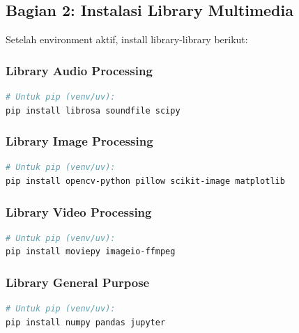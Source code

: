 \documentclass[11pt,a4paper]{article}
\begin{document}
\subsection{Bagian 2: Instalasi Library Multimedia}
Setelah environment aktif, install library-library berikut:

\subsubsection{Library Audio Processing}
\begin{lstlisting}[language=bash, caption=Instalasi library audio]
# Untuk pip (venv/uv):
pip install librosa soundfile scipy
\end{lstlisting}

\subsubsection{Library Image Processing}
\begin{lstlisting}[language=bash, caption=Instalasi library image]
# Untuk pip (venv/uv):
pip install opencv-python pillow scikit-image matplotlib
\end{lstlisting}

\subsubsection{Library Video Processing}
\begin{lstlisting}[language=bash, caption=Instalasi library video]
# Untuk pip (venv/uv):
pip install moviepy imageio-ffmpeg
\end{lstlisting}

\subsubsection{Library General Purpose}
\begin{lstlisting}[language=bash, caption=Instalasi library umum]
# Untuk pip (venv/uv):
pip install numpy pandas jupyter
\end{lstlisting}
\end{document}
